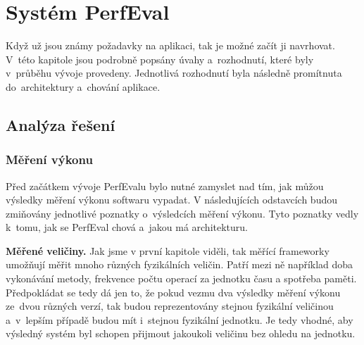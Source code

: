 \chapter{Systém PerfEval}

Když už jsou známy požadavky na aplikaci, tak je možné začít ji navrhovat.
V~této kapitole jsou podrobně popsány úvahy a~rozhodnutí, které byly v~průběhu vývoje
provedeny. Jednotlivá rozhodnutí byla následně promítnuta do~architektury a~chování aplikace.


\section{Analýza řešení}

\subsection{Měření výkonu}

Před začátkem vývoje PerfEvalu bylo nutné zamyslet nad tím, jak můžou výsledky měření výkonu softwaru vypadat.
V následujících odstavcích budou zmiňovány jednotlivé poznatky o~výsledcích měření výkonu.
Tyto poznatky vedly k~tomu, jak se PerfEval chová a~jakou má architekturu.

\medskip

\noindent\textbf{Měřené veličiny.} Jak jsme v první kapitole viděli, tak měřící
frameworky umožňují měřit mnoho různých fyzikálních veličin. Patří mezi ně například
doba vykonávání metody, frekvence počtu operací za jednotku času a spotřeba paměti.
Předpokládat se tedy dá jen to, že pokud vezmu dva výsledky měření výkonu ze~dvou různých
verzí, tak budou reprezentovány stejnou fyzikální veličinou a~v~lepším případě budou mít
i~stejnou fyzikální jednotku. Je tedy vhodné, aby výsledný systém byl schopen přijmout
jakoukoli veličinu bez ohledu na jednotku.

